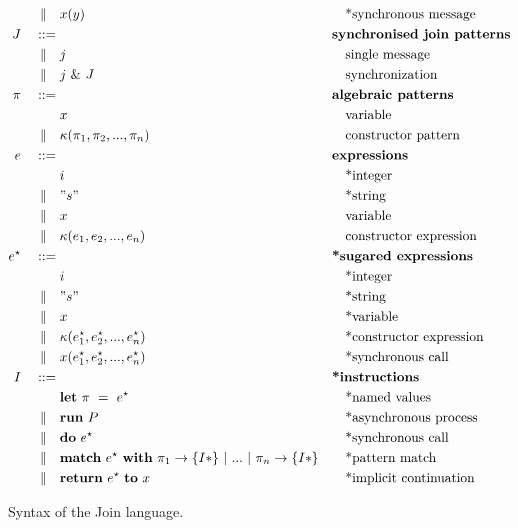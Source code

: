 \begin{figure}
\begin{align*}
\mid\kern-1pt\mid\quad& x(y)
                           && \quad\textrm{*synchronous message} \\
J\quad ::={}&              && \textbf{synchronised join patterns}\\
\mid\kern-1pt\mid\quad& j               && \quad\textrm{single message}\\
\mid\kern-1pt\mid\quad& j ~\&~ J
                           && \quad\textrm{synchronization} \\
\pi\quad ::={}&            && \textbf{algebraic patterns} \\
         & x               && \quad\textrm{variable} \\
\mid\kern-1pt\mid\quad& \kappa(\pi_1, \pi_2, ..., \pi_n)
                           && \quad\textrm{constructor pattern} \\
e\quad ::={}&              && \textbf{expressions} \\
         & i               && \quad\textrm{*integer} \\
\mid\kern-1pt\mid\quad& " s "         && \quad\textrm{*string} \\
\mid\kern-1pt\mid\quad& x               && \quad\textrm{variable} \\
\mid\kern-1pt\mid\quad& \kappa(e_1, e_2, ..., e_n)
                           && \quad\textrm{constructor expression} \\
e^\star\quad ::={}&         && \textbf{*sugared expressions} \\
         & i               && \quad\textrm{*integer} \\
\mid\kern-1pt\mid\quad& " s "         && \quad\textrm{*string} \\
\mid\kern-1pt\mid\quad& x               && \quad\textrm{*variable} \\
\mid\kern-1pt\mid\quad& \kappa(e^\star_1, e^\star_2, ..., e^\star_n)
                           && \quad\textrm{*constructor expression} \\
\mid\kern-1pt\mid\quad& x(e^\star_1, e^\star_2, ..., e^\star_ n)
                           && \quad\textrm{*synchronous call} \\
I\quad ::={}&              && \textbf{*instructions} \\
         & \mathbf{let}~\pi~=~e^\star
                           && \quad\textrm{*named values} \\
\mid\kern-1pt\mid\quad& \mathbf{run}~P  && \quad\textrm{*asynchronous process} \\
\mid\kern-1pt\mid\quad& \mathbf{do}~e^\star && \quad\textrm{*synchronous call} \\
\mid\kern-1pt\mid\quad& \textbf{match}~e^\star~\textbf{with}~\pi_1
               \rightarrow \{ I* \} ~|~ ... ~|~ \pi_n \rightarrow \{ I* \}
                           && \quad\textrm{*pattern match} \\
\mid\kern-1pt\mid\quad& \textbf{return}~e^\star~\textbf{to}~x
                           && \quad\textrm{*implicit continuation}
\end{align*}
\caption{Syntax of the Join language.\label{fig:syntax}}
\end{figure}


